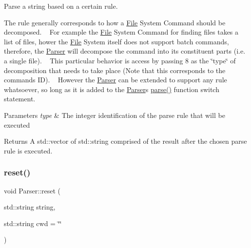 Parse a string based on a certain rule. 

The rule generally corresponds to how a \mbox{\hyperlink{classFile}{File}} System Command should be decomposed. ~\newline
For example the \mbox{\hyperlink{classFile}{File}} System Command for finding files takes a list of files, hower the \mbox{\hyperlink{classFile}{File}} System itself does not support batch commands, therefore, the \mbox{\hyperlink{classParser}{Parser}} will decompose the command into its constituent parts (i.\+e. a single file). ~\newline
This particular behavior is access by passing \textquotesingle{}8\textquotesingle{} as the \char`\"{}type\char`\"{} of decomposition that needs to take place (Note that this corresponds to the command\textquotesingle{}s ID). ~\newline
However the \mbox{\hyperlink{classParser}{Parser}} can be extended to support any rule whatsoever, so long as it is added to the \mbox{\hyperlink{classParser}{Parser}}\textquotesingle{}s \mbox{\hyperlink{classParser_a5b531e9ed867eeb8ccb9cb088cf35c24}{parse()}} function switch statement.


\begin{DoxyParams}{Parameters}
{\em type} & The integer identification of the parse rule that will be executed\\
\hline
\end{DoxyParams}
\begin{DoxyReturn}{Returns}
A std\+::vector of std\+::string comprised of the result after the chosen parse rule is executed. 
\end{DoxyReturn}
\mbox{\label{classParser_a87f5e73ca10ef5f84f37a4b37e0e6f59}} 
\subsubsection{\texorpdfstring{reset()}{reset()}\hspace{0.1cm}{\footnotesize\ttfamily [1/3]}}
{\footnotesize\ttfamily void Parser\+::reset (\begin{DoxyParamCaption}\item[{std\+::string}]{string,  }\item[{std\+::string}]{cwd = {\ttfamily \char`\"{}\char`\"{}} }\end{DoxyParamCaption})}



